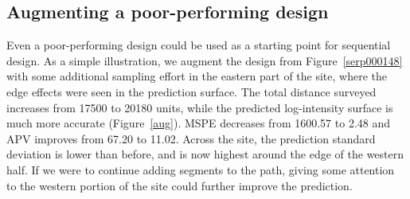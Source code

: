 \documentclass[review]{elsarticle}
\begin{document}


\subsection{Augmenting a poor-performing design}

Even a poor-performing design could be used as a starting point for sequential
design. As a simple illustration, we augment the design from
Figure~\ref{serp000148} with some additional sampling effort in the eastern
part of the site, where the edge effects were seen in the prediction surface.
The total distance surveyed increases from 17500 to 20180 units, while the
predicted log-intensity surface is much more accurate (Figure~\ref{aug}).
MSPE decreases from 1600.57 to 2.48 and APV improves from 67.20 to 11.02.
Across the site, the prediction standard deviation is lower than before, and
is now highest around the edge of the western half. If we were to continue
adding segments to the path, giving some attention to the western portion of
the site could further improve the prediction.
\end{document}
